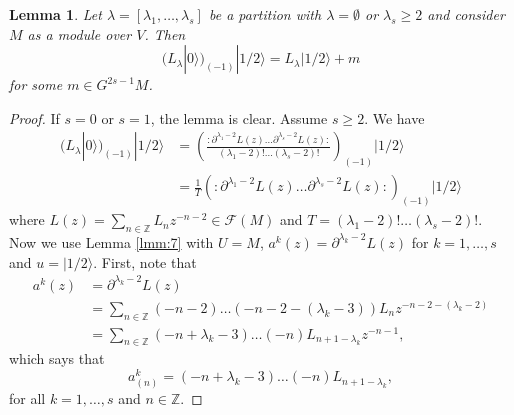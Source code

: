 \documentclass[12pt, a4paper]{article}
\newtheorem{lemma}{Lemma}
\newcommand{\vac}{|0\rangle}
\newcommand{\vachalf}{|1/2\rangle}
\begin{document}
\begin{lemma}
  \label{lmm:8}
  Let $\lambda=[\lambda_1,\dots, \lambda_s]$ be a partition with $\lambda=\emptyset$ or $\lambda_s\ge 2$ and consider $M$ as a module over $V$.
  Then
  \begin{equation*}
    (L_\lambda\vac)_{(-1)}\vachalf=L_\lambda\vachalf+m
  \end{equation*}
  for some $m\in G^{2s-1}M$.
\end{lemma}
\begin{proof}
  If $s=0$ or $s=1$, the lemma is clear.
  Assume $s\ge 2$.
  We have
  \begin{align*}
    (L_\lambda\vac)_{(-1)}\vachalf&=\left( \frac{:\partial^{\lambda_1-2}L(z)\dots\partial^{\lambda_s-2}L(z):}{(\lambda_1-2)!\dots(\lambda_s-2)!} \right)_{(-1)}\vachalf \\
    &=\frac{1}{T}(:\partial^{\lambda_1-2}L(z)\dots\partial^{\lambda_s-2}L(z):)_{(-1)}\vachalf
  \end{align*}
  where $L(z)=\sum_{n\in \mathbb{Z}}L_nz^{-n-2}\in \mathcal{F}(M)$ and $T=(\lambda_1-2)!\dots(\lambda_s-2)!$.
  Now we use Lemma \ref{lmm:7} with $U=M$, $a^k(z)=\partial^{\lambda_k-2}L(z)$ for $k=1,\dots,s$ and $u=\vachalf$.
  First, note that
  \begin{align*}
    a^k(z)&=\partial^{\lambda_k-2}L(z) \\
    &=\sum_{n\in \mathbb{Z}}(-n-2)\dots(-n-2-(\lambda_k-3))L_nz^{-n-2-(\lambda_k-2)} \\
    &=\sum_{n\in \mathbb{Z}}(-n+\lambda_k-3)\dots(-n)L_{n+1-\lambda_k}z^{-n-1},
  \end{align*}
  which says that
  \begin{equation*}
    a^k_{(n)}=(-n+\lambda_k-3)\dots(-n)L_{n+1-\lambda_k},
  \end{equation*}
  for all $k=1,\dots, s$ and $n\in \mathbb{Z}$.


\end{proof}
\end{document}
